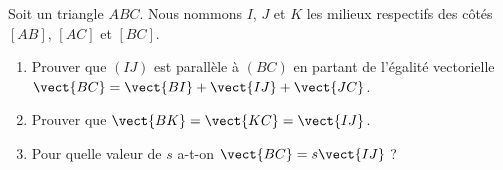 
\begin{exercice}\label{exosmath-0112}

    Soit un triangle \( ABC\). Nous nommons \( I\), \( J\) et \( K\) les milieux respectifs des côtés \( [AB]\), \( [AC]\) et \( [BC]\).
    \begin{enumerate}
        \item
            Prouver que \( (IJ)\) est parallèle à \( (BC)\) en partant de l'égalité vectorielle \( \vect{ BC }=\vect{ BI }+\vect{ IJ }+\vect{ JC }\).
        \item
            Prouver que \( \vect{ BK }=\vect{ KC }=\vect{ IJ }\).
        \item
            Pour quelle valeur de \( s\) a-t-on \( \vect{ BC }=s\vect{ IJ }\) ?
    \end{enumerate}

\end{exercice}
